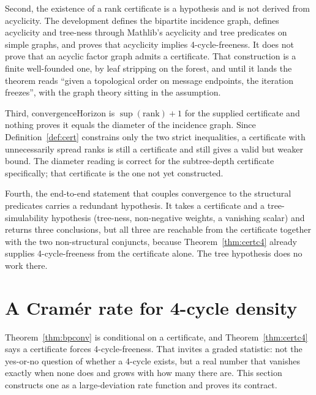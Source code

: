 \documentclass[aps,prx,reprint,nofootinbib,floatfix]{revtex4-2}
\begin{document}
Second, the existence of a rank certificate is a hypothesis and is not derived
from acyclicity. The development defines the bipartite incidence graph, defines
acyclicity and tree-ness through Mathlib's acyclicity and tree predicates on
simple graphs, and proves that acyclicity implies
4-cycle-freeness. It does not prove that an acyclic factor graph admits a
certificate. That construction is a finite well-founded one, by leaf stripping
on the forest, and until it lands the theorem reads ``given a topological order
on message endpoints, the iteration freezes'', with the graph theory sitting in
the assumption.

Third, $\mathrm{convergenceHorizon}$ is $\sup(\mathrm{rank}) + 1$ for the
supplied certificate and nothing proves it equals the diameter of the incidence
graph. Since Definition~\ref{def:cert} constrains only the two strict
inequalities, a certificate with unnecessarily spread ranks is still a
certificate and still gives a valid but weaker bound. The diameter reading is
correct for the subtree-depth certificate specifically; that certificate is the
one not yet constructed.

Fourth, the end-to-end statement that couples convergence to the structural
predicates carries a redundant hypothesis. It takes a certificate and a
tree-simulability hypothesis (tree-ness, non-negative weights, a vanishing
scalar) and returns three conclusions, but all three are reachable from the
certificate together with the two non-structural conjuncts, because
Theorem~\ref{thm:certc4} already supplies 4-cycle-freeness from the
certificate alone. The tree hypothesis does no work there.


\section{A Cram\'er rate for 4-cycle density}
\label{sec:rate}

Theorem~\ref{thm:bpconv} is conditional on a certificate, and
Theorem~\ref{thm:certc4} says a certificate forces 4-cycle-freeness. That
invites a graded statistic: not the yes-or-no question of whether a 4-cycle
exists, but a real number that vanishes exactly when none does and grows with
how many there are. This section constructs one as a large-deviation rate
function and proves its contract.
\end{document}
